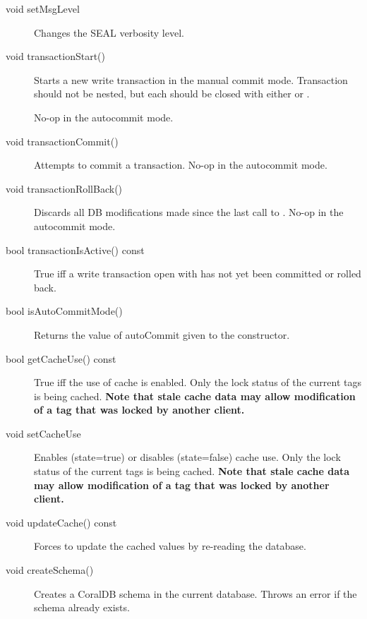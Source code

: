 \begin{description}
\item[void setMsgLevel] Changes
  the SEAL verbosity level.

\item[void transactionStart()] Starts a new write transaction in the
  manual commit mode.  Transaction should not be nested, but each
  should be closed with either  or
  .

  No-op in the autocommit mode.
  
\item[void transactionCommit()] Attempts to commit a
  transaction. No-op in the autocommit mode.

\item[void transactionRollBack()] Discards all DB modifications made
  since the last call to . No-op in the
  autocommit mode.

\item[bool transactionIsActive() const] True iff a write transaction
  open with  has not yet been committed or
  rolled back.

\item[bool isAutoCommitMode()] Returns the value of autoCommit given
  to the constructor.



\item[bool getCacheUse() const] True iff the use of cache is enabled.
  Only the lock status of the current tags is being cached.
  \textbf{Note that stale cache data may allow modification of a tag
    that was locked by another client.}

\item[void setCacheUse] Enables (state=true) or
  disables (state=false) cache use. Only the lock status of the
  current tags is being cached.  \textbf{Note that stale cache data
    may allow modification of a tag that was locked by another
    client.}

\item[void updateCache() const] Forces to update the cached values
   by re-reading the database.  


\item[void createSchema()] Creates a CoralDB schema in the current
  database. Throws an error if the schema already exists.


\end{description}

